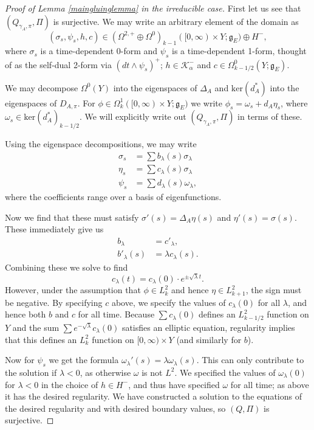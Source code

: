 \documentclass{memo-l}
\theoremstyle{definition}
\theoremstyle{remark}
\numberwithin{section}{chapter}
\numberwithin{equation}{chapter}
\begin{document}
\begin{proof}[Proof of Lemma \ref{maingluinglemma} in the irreducible case]
First let us see that $(Q_{\gamma_A,\pi}, \Pi)$ is surjective. We may write an arbitrary element of the domain as $$(\sigma_s, \psi_s, h, c) \in (\Omega^{2,+} \oplus\Omega^0)_{k-1}([0,\infty) \times Y; \mathfrak g_E) \oplus H^-,$$ where $\sigma_s$ is a time-dependent $0$-form and $\psi_s$ is a time-dependent 1-form, thought of as the self-dual 2-form via $(dt \wedge \psi_s)^+$; $h \in \mathcal K^-_\alpha$ and $c \in \Omega^0_{k-1/2}(Y;\mathfrak g_E)$.

We may decompose $\Omega^0(Y)$ into the eigenspaces of $\Delta_A$ and $\text{ker}(d_A^*)$ into the eigenspaces of $D_{A,\pi}$. For $\phi \in \Omega^1_k([0, \infty) \times Y;\mathfrak g_E)$ we write $\phi_s = \omega_s + d_A \eta_s$, where $\omega_s \in \text{ker}(d_A^*)_{k-1/2}$. We will explicitly write out $(Q_{\gamma_A,\pi}, \Pi)$ in terms of these. 

Using the eigenspace decompositions, we may write 
\begin{align*}\sigma_s &= \sum b_\lambda(s) \sigma_\lambda \\
\eta_s &= \sum c_\lambda(s) \sigma_\lambda \\
\psi_s &= \sum d_\lambda(s) \omega_\lambda,
\end{align*}
where the coefficients range over a basis of eigenfunctions.

Now we find that these must satisfy $\sigma'(s) = \Delta_A \eta(s)$ and $\eta'(s) = \sigma(s)$. These immediately give us
\begin{align*}b_\lambda &= c'_\lambda, \\
b'_\lambda(s) &= \lambda c_\lambda(s).\end{align*}
Combining these we solve to find 
$$c_\lambda(t) = c_\lambda(0) \cdot e^{\pm \sqrt{\lambda} t}.$$ 
However, under the assumption that $\phi \in L^2_k$ and hence $\eta \in L^2_{k+1}$, the sign must be negative. By specifying $c$ above, we specify the values of $c_\lambda(0)$ for all $\lambda$, and hence both $b$ and $c$ for all time. Because $\sum c_\lambda(0)$ defines an $L^2_{k-1/2}$ function on $Y$ and the sum $\sum e^{-\sqrt{\lambda}} c_\lambda(0)$ satisfies an elliptic equation, regularity implies that this defines an $L^2_k$ function on $[0,\infty) \times Y$ (and similarly for $b$).

Now for $\psi_s$ we get the formula $\omega_\lambda'(s) = \lambda \omega_\lambda(s)$. This can only contribute to the solution if $\lambda < 0$, as otherwise $\omega$ is not $L^2$. We specified the values of $\omega_\lambda(0)$ for $\lambda < 0$ in the choice of $h \in H^-$, and thus have specified $\omega$ for all time; as above it has the desired regularity. We have constructed a solution to the equations of the desired regularity and with desired boundary values, so $(Q,\Pi)$ is surjective. 


\end{proof}
\end{document}
